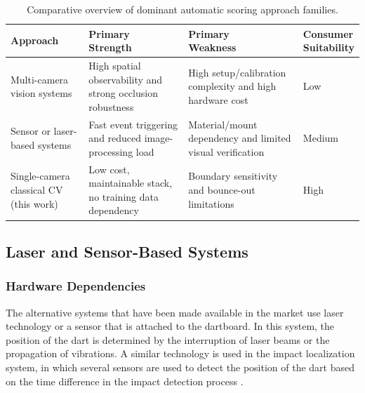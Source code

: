 \vspace{\baselineskip}
\begin{table}[H]
    \centering
    \begin{tabularx}{\linewidth}{@{} >{\hsize=0.9\hsize\arraybackslash}X >{\hsize=1.1\hsize\arraybackslash}X >{\hsize=1.1\hsize\arraybackslash}X >{\hsize=0.9\hsize\centering\arraybackslash}X @{}}
        \toprule
        \textbf{Approach} & \shortstack[l]{\textbf{Primary}\\\textbf{Strength}} & \shortstack[l]{\textbf{Primary}\\\textbf{Weakness}} & \shortstack{\textbf{Consumer}\\\textbf{Suitability}} \\
        \midrule
        Multi-camera vision systems & High spatial observability and strong occlusion robustness & High setup/calibration complexity and high hardware cost & Low \\
        Sensor or laser-based systems & Fast event triggering and reduced image-processing load & Material/mount dependency and limited visual verification & Medium \\
        Single-camera classical CV (this work) & Low cost, maintainable stack, no training data dependency & Boundary sensitivity and bounce-out limitations & High \\
        \bottomrule
    \end{tabularx}
    \caption{Comparative overview of dominant automatic scoring approach families.}
    \label{tab:related_work_comparison}
\end{table}
\vspace{\baselineskip}

\subsection{Laser and Sensor-Based Systems}

\subsubsection{Hardware Dependencies}

The alternative systems that have been made available in the market use laser technology or a sensor that is attached to the dartboard. In this system, the position of the dart is determined by the interruption of laser beams or the propagation of vibrations. A similar technology is used in the impact localization system, in which several sensors are used to detect the position of the dart based on the time difference in the impact detection process \cite{Schwingshackl2010}.

